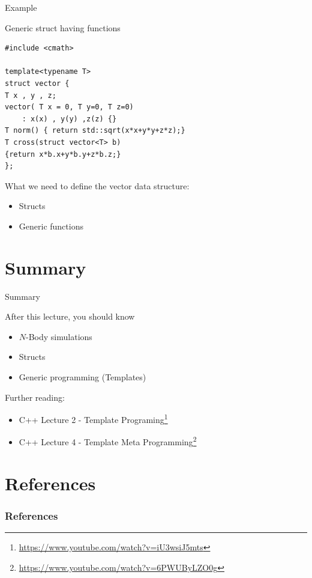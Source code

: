 \documentclass[12pt,t]{beamer}
\begin{document}
\begin{frame}[fragile]{Example}
\begin{block}{Generic struct having functions}
\begin{lstlisting}
#include <cmath>

template<typename T>
struct vector {
T x , y , z;
vector( T x = 0, T y=0, T z=0)
	: x(x) , y(y) ,z(z) {}
T norm() { return std::sqrt(x*x+y*y+z*z);}
T cross(struct vector<T> b)
{return x*b.x+y*b.y+z*b.z;}
};
\end{lstlisting}
\end{block}

\begin{block}{What we need to define the vector data structure:}
\begin{itemize}
\item Structs
\item Generic functions
\end{itemize}
\end{block}

\end{frame}





\section{Summary}
\begin{frame}{Summary}
\begin{block}{After this lecture, you should know}
\begin{itemize}
\item $N$-Body simulations
\item Structs
\item Generic programming (Templates)
\end{itemize}
\end{block}

\begin{block}{Further reading:}
\begin{itemize}
\item C++ Lecture 2 - Template Programing\footnote{\tiny\url{https://www.youtube.com/watch?v=iU3wsiJ5mts}}
\item C++ Lecture 4 - Template Meta Programming\footnote{\tiny\url{https://www.youtube.com/watch?v=6PWUByLZO0g}}
\end{itemize}


\end{block}



\end{frame}



\section{References}

\begin{frame}[t, allowframebreaks]
\frametitle{References}


\end{frame}
\end{document}
